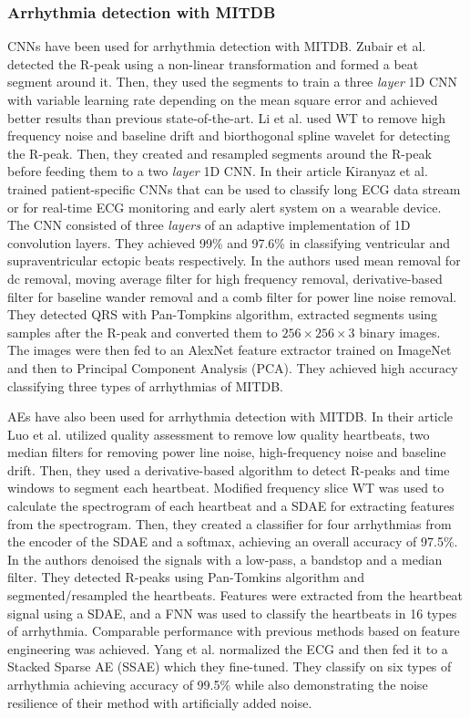 \documentclass[journal]{IEEEtran}
\begin{document}
\subsubsection{Arrhythmia detection with MITDB}
CNNs have been used for arrhythmia detection with MITDB\@.
Zubair et al.\cite{zubair2016automated} detected the R-peak using a non-linear transformation and formed a beat segment around it.
Then, they used the segments to train a three \textit{layer} 1D CNN with variable learning rate depending on the mean square error and achieved better results than previous state-of-the-art.
Li et al.\cite{li2017classification} used WT to remove high frequency noise and baseline drift and biorthogonal spline wavelet for detecting the R-peak.
Then, they created and resampled segments around the R-peak before feeding them to a two \textit{layer} 1D CNN\@.
In their article Kiranyaz et al.\cite{kiranyaz2016real} trained patient-specific CNNs that can be used to classify long ECG data stream or for real-time ECG monitoring and early alert system on a wearable device.
The CNN consisted of three \textit{layers} of an adaptive implementation of 1D convolution layers.
They achieved 99\% and 97.6\% in classifying ventricular and supraventricular ectopic beats respectively.
In\cite{isin2017cardiac} the authors used mean removal for dc removal, moving average filter for high frequency removal, derivative-based filter for baseline wander removal and a comb filter for power line noise removal.
They detected QRS with Pan-Tompkins algorithm\cite{pan1985real}, extracted segments using samples after the R-peak and converted them to $256\times 256\times 3$ binary images.
The images were then fed to an AlexNet feature extractor trained on ImageNet and then to Principal Component Analysis (PCA).
They achieved high accuracy classifying three types of arrhythmias of MITDB\@.

AEs have also been used for arrhythmia detection with MITDB\@.
In their article Luo et al.\cite{luo2017patient} utilized quality assessment to remove low quality heartbeats, two median filters for removing power line noise, high-frequency noise and baseline drift.
Then, they used a derivative-based algorithm to detect R-peaks and time windows to segment each heartbeat.
Modified frequency slice WT was used to calculate the spectrogram of each heartbeat and a SDAE for extracting features from the spectrogram.
Then, they created a classifier for four arrhythmias from the encoder of the SDAE and a softmax, achieving an overall accuracy of 97.5\%.
In\cite{jiang2017heartbeat} the authors denoised the signals with a low-pass, a bandstop and a median filter.
They detected R-peaks using Pan-Tomkins algorithm and segmented/resampled the heartbeats.
Features were extracted from the heartbeat signal using a SDAE, and a FNN was used to classify the heartbeats in 16 types of arrhythmia.
Comparable performance with previous methods based on feature engineering was achieved.
Yang et al.\cite{yang2017novel} normalized the ECG and then fed it to a Stacked Sparse AE (SSAE) which they fine-tuned.
They classify on six types of arrhythmia achieving accuracy of 99.5\% while also demonstrating the noise resilience of their method with artificially added noise.
\end{document}
